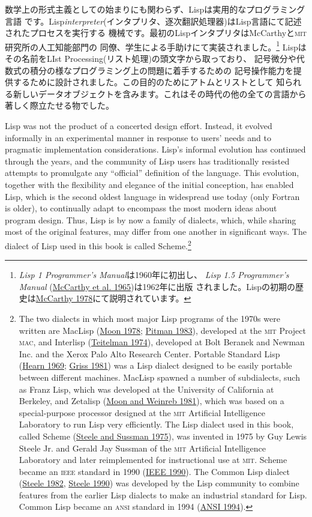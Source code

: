 \documentclass[8pt,oneside]{book}
\newcommand{\acronym}[1]{\textsc{\MakeLowercase{#1}}}
\newcommand{\newterm}[1]{\index{#1}\emph{#1}}
\newcommand{\link}[1]{\hyperref[#1]{#1}}
\begin{document}
数学上の形式主義としての始まりにも関わらず、Lispは実用的なプログラミング言語
です。Lisp\newterm{interpreter}(インタプリタ、逐次翻訳処理器)はLisp言語にて記述されたプロセスを実行する
機械です。最初のLispインタプリタはMcCarthyと\acronym{MIT}研究所の人工知能部門の
同僚、学生による手助けにて実装されました。\footnote{
\textit{Lisp 1 Programmer's Manual}は1960年に初出し、
\textit{Lisp 1.5 Programmer's Manual} (\link{McCarthy et al. 1965})は1962年に出版
されました。Lispの初期の歴史は\link{McCarthy 1978}にて説明されています。}
Lispはその名前をLIst Processing(リスト処理)の頭文字から取っており、
記号微分や代数式の積分の様なプログラミング上の問題に着手するための
記号操作能力を提供するために設計されました。この目的のためにアトムとリストとして
知られる新しいデータオブジェクトを含みます。これはその時代の他の全ての言語から
著しく際立たせる物でした。

Lisp was not the product of a concerted design effort.  Instead, it evolved
informally in an experimental manner in response to users' needs and to
pragmatic implementation considerations.  Lisp's informal evolution has
continued through the years, and the community of Lisp users has traditionally
resisted attempts to promulgate any ``official'' definition of the language.
This evolution, together with the flexibility and elegance of the initial
conception, has enabled Lisp, which is the second oldest language in widespread
use today (only Fortran is older), to continually adapt to encompass the most
modern ideas about program design.  Thus, Lisp is by now a family of dialects,
which, while sharing most of the original features, may differ from one another
in significant ways.  The dialect of Lisp used in this book is called
Scheme.\footnote{The two dialects in which most major Lisp programs of the
1970s were written are MacLisp (\link{Moon 1978}; \link{Pitman 1983}), developed at the
\acronym{MIT} Project \acronym{MAC}, and Interlisp (\link{Teitelman 1974}), developed
at Bolt Beranek and Newman Inc. and the Xerox Palo Alto Research Center.
Portable Standard Lisp (\link{Hearn 1969}; \link{Griss 1981}) was a Lisp dialect designed to
be easily portable between different machines.  MacLisp spawned a number of
subdialects, such as Franz Lisp, which was developed at the University of
California at Berkeley, and Zetalisp (\link{Moon and Weinreb 1981}), which was based on a
special-purpose processor designed at the \acronym{MIT} Artificial Intelligence
Laboratory to run Lisp very efficiently.  The Lisp dialect used in this book,
called Scheme (\link{Steele and Sussman 1975}), was invented in 1975 by Guy Lewis Steele Jr. and
Gerald Jay Sussman of the \acronym{MIT} Artificial Intelligence Laboratory and
later reimplemented for instructional use at \acronym{MIT}.  Scheme became an
\acronym{IEEE} standard in 1990 (\link{IEEE 1990}).  The Common Lisp dialect
(\link{Steele 1982}, \link{Steele 1990}) was developed by the Lisp community to combine
features from the earlier Lisp dialects to make an industrial standard for
Lisp.  Common Lisp became an \acronym{ANSI} standard in 1994 (\link{ANSI 1994}).}
\end{document}
